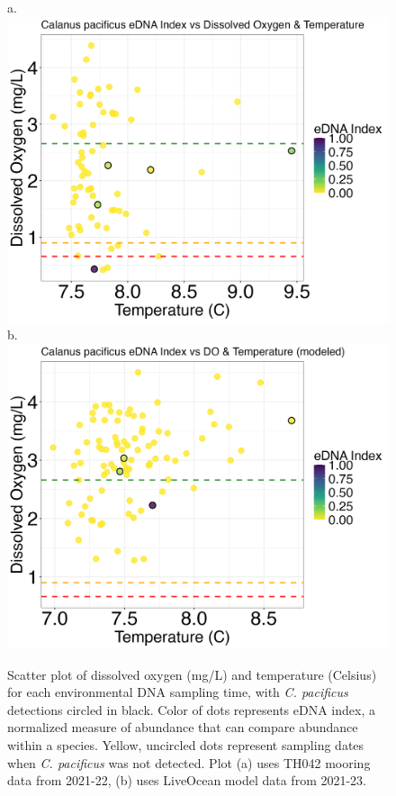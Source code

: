 \documentclass[12pt,twoside]{reedthesis}
\begin{document}
	
	\begin{figure}[!h]
		\begin{center}
			a. \includegraphics[scale=0.3]{Cpacificus_Scatter_noOut}
			b. \includegraphics[scale=0.3]{Cpacificus_Scatter_AllYr_mod_noOut}
			\caption[\textit{C. pacificus} scatterplot]{\footnotesize{Scatter plot of dissolved oxygen (mg/L) and temperature (Celsius) for each environmental DNA sampling time, with \textit{C. pacificus} detections circled in black. Color of dots represents eDNA index, a normalized measure of abundance that can compare abundance within a species. Yellow, uncircled dots represent sampling dates when \textit{C. pacificus} was not detected. Plot (a) uses TH042 mooring data from 2021-22, (b) uses LiveOcean model data from 2021-23.}} %
		\end{center}
		\label{CpacificusScatter}
	\end{figure} 
	
\end{document}

